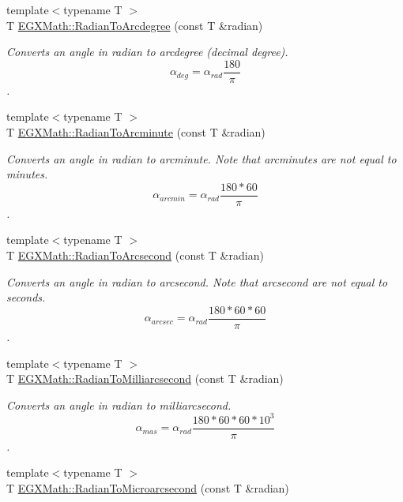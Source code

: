 \begin{DoxyCompactItemize}
{\footnotesize template$<$typename T $>$ }\\T \mbox{\hyperlink{group___e_g_x_math-_angle_conversions-_radian_ga3dfdc97357cc07f8379976bbc08f9852}{E\+G\+X\+Math\+::\+Radian\+To\+Arcdegree}} (const T \&radian)
\begin{DoxyCompactList}\small\item\em Converts an angle in radian to arcdegree (decimal degree). \[\alpha_{deg}=\alpha_{rad}\frac{180}{\pi}\]. \end{DoxyCompactList}\item 
{\footnotesize template$<$typename T $>$ }\\T \mbox{\hyperlink{group___e_g_x_math-_angle_conversions-_radian_ga722e3b8e78540a6b3942b73b64aeb8d2}{E\+G\+X\+Math\+::\+Radian\+To\+Arcminute}} (const T \&radian)
\begin{DoxyCompactList}\small\item\em Converts an angle in radian to arcminute. Note that arcminutes are not equal to minutes. \[\alpha_{arcmin}=\alpha_{rad}\frac{180 * 60}{\pi}\]. \end{DoxyCompactList}\item 
{\footnotesize template$<$typename T $>$ }\\T \mbox{\hyperlink{group___e_g_x_math-_angle_conversions-_radian_ga2f952f6675a0fc54bf72bfe4e3d2664a}{E\+G\+X\+Math\+::\+Radian\+To\+Arcsecond}} (const T \&radian)
\begin{DoxyCompactList}\small\item\em Converts an angle in radian to arcsecond. Note that arcsecond are not equal to seconds. \[\alpha_{arcsec}=\alpha_{rad}\frac{180 * 60 * 60}{\pi}\]. \end{DoxyCompactList}\item 
{\footnotesize template$<$typename T $>$ }\\T \mbox{\hyperlink{group___e_g_x_math-_angle_conversions-_radian_ga84fbb494a455cfeb30be62776f96c9a9}{E\+G\+X\+Math\+::\+Radian\+To\+Milliarcsecond}} (const T \&radian)
\begin{DoxyCompactList}\small\item\em Converts an angle in radian to milliarcsecond. \[\alpha_{mas}=\alpha_{rad}\frac{180 * 60 * 60 * 10^3}{\pi}\]. \end{DoxyCompactList}\item 
{\footnotesize template$<$typename T $>$ }\\T \mbox{\hyperlink{group___e_g_x_math-_angle_conversions-_radian_ga3a515ca2838a305fa40750763f546a86}{E\+G\+X\+Math\+::\+Radian\+To\+Microarcsecond}} (const T \&radian)

\end{DoxyCompactItemize}
